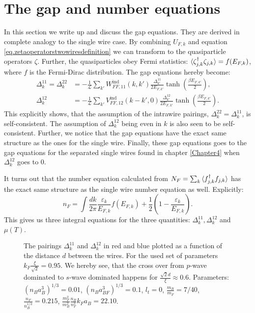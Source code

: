 \section{The gap and number equations}
In this section we write up and discuss the gap equations. They are derived in complete analogy to the single wire case. By combining $U_{F,k}$ and equation \ref{eq.zetaoperatorstwowiresdefinition} we can transform to the quasiparticle operators $\zeta$. Further, the quasiparticles obey Fermi statistics: $\braket{\zeta^\dagger_{j,k}\zeta_{j, k}} = f(E_{F,k})$, where $f$ is the Fermi-Dirac distribution. The gap equations hereby become:
\begin{align}
\Delta^{11}_k = \Delta^{22}_k &= -\frac{1}{\mathcal{L}}\sum_{k'} W^\text{ind}_{FF,11}(k,k')\frac{\Delta^{11}_{k'}}{2E_{F,k'}}\tanh\left(\frac{\beta E_{F,k'}}{2}\right), \nonumber \\
\Delta^{12}_k &= -\frac{1}{\mathcal{L}}\sum_{k'} V^\text{ind}_{FF,12}(k - k',0)\frac{\Delta^{12}_{k'}}{2E_{F,k'}}\tanh\left(\frac{\beta E_{F,k'}}{2}\right).
\end{align}
This explicitly shows, that the assumption of the intrawire pairings, $\Delta^{22}_k = \Delta^{11}_k$, is self-consistent. The assumption of $\Delta^{12}_k$ being even in $k$ is also seen to be self-consistent. Further, we notice that the gap equations have the exact same structure as the ones for the single wire. Finally, these gap equations goes to the gap equations for the separated single wires found in chapter \ref{Chapter4} when $\Delta^{12}_k$ goes to $0$.  

It turns out that the number equation calculated from $N_F = \sum_k \braket{f^\dagger_{j,k}f_{j,k}}$ has the exact same structure as the single wire number equation as well. Explicitly: 
\begin{equation}
n_F = \int \frac{dk}{2\pi} \frac{\varepsilon_k}{E_{F,k}}f(E_{F,k}) + \frac{1}{2}\left(1 - \frac{\varepsilon_k}{E_{F,k}}\right). 
\label{eq.numberequationtwowires}
\end{equation}
This gives us three integral equations for the three quantities: $\Delta^{11}_k, \Delta^{12}_k$ and $\mu(T)$.

\begin{figure} 
\begin{center}  
  
\caption{The pairings $\Delta^{11}_k$ and $\Delta^{12}_k$ in red and blue plotted as a function of the distance $d$ between the wires. For the used set of parameters $k_F\frac{\xi}{\sqrt{2}} = 0.95$. We hereby see, that the cross over from $p$-wave dominated to $s$-wave dominated happens for $\frac{\sqrt{2}d}{\xi} \approx 0.6$. Parameters: $(n_Ba_B^3)^{1/3} = 0.01$, $(n_Ba_{BF}^3)^{1/3} = 0.1$, $l_t = 0$, $\frac{m_B}{m_F} = 7/40$, $\frac{n_F}{n_B^{1/3}} = 0.215$, $\frac{m_F^2}{m_B^2}\frac{n_B}{n_F^3} k_Fa_B = 22.10$. }  
\label{fig.maximalpairingddepend}  
\end{center}    
\end{figure}

